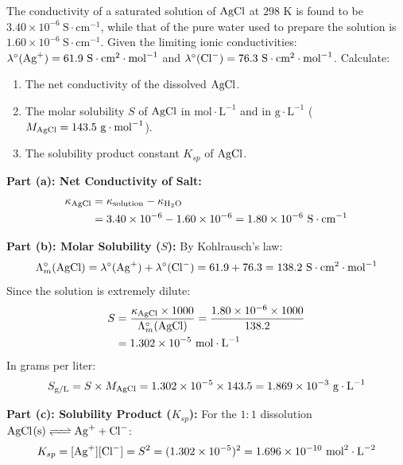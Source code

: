 \begin{examplebox}
The conductivity of a saturated solution of $\ce{AgCl}$ at $298\text{ K}$ is found to be $3.40 \times 10^{-6}\ \text{S}\cdot\text{cm}^{-1}$, while that of the pure water used to prepare the solution is $1.60 \times 10^{-6}\ \text{S}\cdot\text{cm}^{-1}$. Given the limiting ionic conductivities:
$\lambda^\circ(\ce{Ag+}) = 61.9\ \text{S}\cdot\text{cm}^2\cdot\text{mol}^{-1}$ and $\lambda^\circ(\ce{Cl-}) = 76.3\ \text{S}\cdot\text{cm}^2\cdot\text{mol}^{-1}$.
Calculate:
\begin{enumerate}[label=(\alph*)]
    \item The net conductivity of the dissolved $\ce{AgCl}$.
    \item The molar solubility $S$ of $\ce{AgCl}$ in $\text{mol}\cdot\text{L}^{-1}$ and in $\text{g}\cdot\text{L}^{-1}$ ($M_{\ce{AgCl}} = 143.5\text{ g}\cdot\text{mol}^{-1}$).
    \item The solubility product constant $K_{sp}$ of $\ce{AgCl}$.
\end{enumerate}
\tcblower
\textbf{Part (a): Net Conductivity of Salt:}
\begin{align*}
    \kappa_{\ce{AgCl}} &= \kappa_{\text{solution}} - \kappa_{\ce{H2O}} \\
    &= 3.40 \times 10^{-6} - 1.60 \times 10^{-6} = 1.80 \times 10^{-6}\ \text{S}\cdot\text{cm}^{-1}
\end{align*}

\textbf{Part (b): Molar Solubility ($S$):}
By Kohlrausch's law:
\begin{equation*}
    \Lambda_m^\circ(\ce{AgCl}) = \lambda^\circ(\ce{Ag+}) + \lambda^\circ(\ce{Cl-}) = 61.9 + 76.3 = 138.2\ \text{S}\cdot\text{cm}^2\cdot\text{mol}^{-1}
\end{equation*}
Since the solution is extremely dilute:
\begin{align*}
    S &= \frac{\kappa_{\ce{AgCl}} \times 1000}{\Lambda_m^\circ(\ce{AgCl})} = \frac{1.80 \times 10^{-6} \times 1000}{138.2} \\
    &= 1.302 \times 10^{-5}\ \text{mol}\cdot\text{L}^{-1}
\end{align*}
In grams per liter:
\begin{equation*}
    S_{\text{g/L}} = S \times M_{\ce{AgCl}} = 1.302 \times 10^{-5} \times 143.5 = 1.869 \times 10^{-3}\ \text{g}\cdot\text{L}^{-1}
\end{equation*}

\textbf{Part (c): Solubility Product ($K_{sp}$):}
For the $1:1$ dissolution $\ce{AgCl(s) <=> Ag+ + Cl-}$:
\begin{equation*}
    K_{sp} = [\ce{Ag+}][\ce{Cl-}] = S^2 = (1.302 \times 10^{-5})^2 = 1.696 \times 10^{-10}\ \text{mol}^2\cdot\text{L}^{-2}
\end{equation*}
\end{examplebox}

